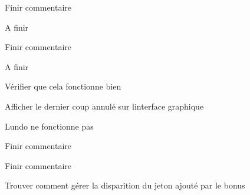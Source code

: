 
\begin{DoxyRefList}
\item[Membre \mbox{\hyperlink{namespacesrc_1_1controller_1_1ctrl__pageJeu_a4c36c8421a6673162c8b7d26eec6ff5a}{src\+::controller\+::ctrl\+\_\+page\+Jeu.cpj\+\_\+bonus}} ()]\label{todo__todo000004}%
%
Finir commentaire 
\item[Membre \mbox{\hyperlink{namespacesrc_1_1controller_1_1ctrl__pageJeu_ae47c3cc32463683be9c6da658860d411}{src\+::controller\+::ctrl\+\_\+page\+Jeu.cpj\+\_\+bot\+\_\+play}} (tk.\+Frame tkf\+\_\+page\+\_\+jeu)]\label{todo__todo000005}%
%
A finir 
\item[Membre \mbox{\hyperlink{namespacesrc_1_1controller_1_1ctrl__pageJeu_a9ca508f723a10e70b2a2131bf48bb125}{src\+::controller\+::ctrl\+\_\+page\+Jeu.cpj\+\_\+get\+\_\+bonuses}} ()]\label{todo__todo000007}%
%
Finir commentaire 
\item[Membre \mbox{\hyperlink{namespacesrc_1_1controller_1_1ctrl__pageJeu_a40404805f413c0c4832002ab40bb935f}{src\+::controller\+::ctrl\+\_\+page\+Jeu.cpj\+\_\+play}} (tk.\+Event event, tk.\+Frame tkf\+\_\+page\+\_\+jeu)]\label{todo__todo000003}%
%
A finir 
\item[Membre \mbox{\hyperlink{namespacesrc_1_1controller_1_1ctrl__pageJeu_a46555fa951b27730d85476196e84c594}{src\+::controller\+::ctrl\+\_\+page\+Jeu.cpj\+\_\+redo}} ()]\label{todo__todo000002}%
%
Vérifier que cela fonctionne bien 
\item[Membre \mbox{\hyperlink{namespacesrc_1_1controller_1_1ctrl__pageJeu_ae21bd21e863bcfecc6295c0432e8ef1d}{src\+::controller\+::ctrl\+\_\+page\+Jeu.cpj\+\_\+undo}} ()]\label{todo__todo000001}%
%
Afficher le dernier coup annulé sur l\textquotesingle{}interface graphique 

L\textquotesingle{}undo ne fonctionne pas 
\item[Membre \mbox{\hyperlink{namespacesrc_1_1controller_1_1ctrl__pageJeu_a81868138c404cf6214153a7fa1aac7e5}{src\+::controller\+::ctrl\+\_\+page\+Jeu.cpj\+\_\+update\+\_\+grid}} ()]\label{todo__todo000006}%
%
Finir commentaire 
\item[Membre \mbox{\hyperlink{namespacesrc_1_1controller_1_1ctrl__pageJeu_a1a7d05a90dd816cb45ab9f45998a1510}{src\+::controller\+::ctrl\+\_\+page\+Jeu.cpj\+\_\+valider\+\_\+bonus}} ()]\label{todo__todo000008}%
%
Finir commentaire 
\item[Membre \mbox{\hyperlink{namespacesrc_1_1puissanceQuatre_1_1bonus_af98d92eddfe18f1059af0c912ab8b402}{src\+::puissance\+Quatre\+::bonus.p4b\+\_\+block\+\_\+column}} (np.\+array npa\+\_\+grid, int i\+\_\+col)]\label{todo__todo000009}%
%
Trouver comment gérer la disparition du jeton ajouté par le bonus 


\end{DoxyRefList}
